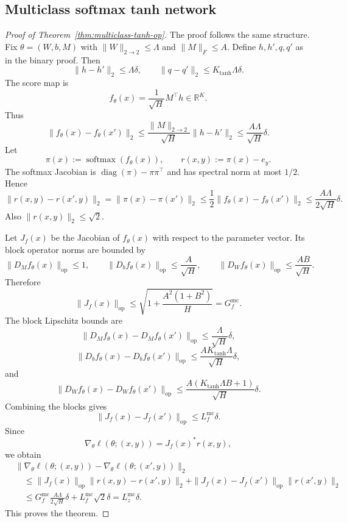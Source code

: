 \documentclass[conference,compsoc]{IEEEtran}
\DeclareMathOperator{\softmax}{softmax}
\DeclareMathOperator{\diag}{diag}
\newcommand{\R}{\mathbb{R}}
\begin{document}
\subsection{Multiclass softmax tanh network}

\begin{proof}[Proof of Theorem~\ref{thm:multiclass-tanh-op}]
The proof follows the same structure. Fix $\theta=(W,b,M)$ with $\|W\|_{2\to2}\le\Lambda$ and $\|M\|_F\le A$. Define $h,h',q,q'$ as in the binary proof. Then
\[
\|h-h'\|_2\le\Lambda\delta,
\qquad
\|q-q'\|_2\le K_{\tanh}\Lambda\delta.
\]
The score map is
\[
f_\theta(x)=\frac1{\sqrt H}M^\top h\in\R^K.
\]
Thus
\[
\|f_\theta(x)-f_\theta(x')\|_2
\le\frac{\|M\|_{2\to2}}{\sqrt H}\|h-h'\|_2
\le\frac{A\Lambda}{\sqrt H}\delta.
\]
Let
\[
\pi(x):=\softmax(f_\theta(x)),
\qquad
r(x,y):=\pi(x)-e_y.
\]
The softmax Jacobian is $\diag(\pi)-\pi\pi^\top$ and has spectral norm at most $1/2$. Hence
\[
\|r(x,y)-r(x',y)\|_2
=\|\pi(x)-\pi(x')\|_2
\le\frac12\|f_\theta(x)-f_\theta(x')\|_2
\le\frac{A\Lambda}{2\sqrt H}\delta.
\]
Also $\|r(x,y)\|_2\le\sqrt2$.

Let $J_f(x)$ be the Jacobian of $f_\theta(x)$ with respect to the parameter vector. Its block operator norms are bounded by
\[
\|D_M f_\theta(x)\|_{\mathrm{op}}\le1,
\qquad
\|D_b f_\theta(x)\|_{\mathrm{op}}\le\frac{A}{\sqrt H},
\qquad
\|D_W f_\theta(x)\|_{\mathrm{op}}\le\frac{AB}{\sqrt H}.
\]
Therefore
\[
\|J_f(x)\|_{\mathrm{op}}
\le
\sqrt{1+\frac{A^2(1+B^2)}{H}}
=G_f^{\mathrm{mc}}.
\]
The block Lipschitz bounds are
\[
\|D_M f_\theta(x)-D_M f_\theta(x')\|_{\mathrm{op}}
\le\frac{\Lambda}{\sqrt H}\delta,
\]
\[
\|D_b f_\theta(x)-D_b f_\theta(x')\|_{\mathrm{op}}
\le\frac{AK_{\tanh}\Lambda}{\sqrt H}\delta,
\]
and
\[
\|D_W f_\theta(x)-D_W f_\theta(x')\|_{\mathrm{op}}
\le\frac{A(K_{\tanh}\Lambda B+1)}{\sqrt H}\delta.
\]
Combining the blocks gives
\[
\|J_f(x)-J_f(x')\|_{\mathrm{op}}\le L_f^{\mathrm{mc}}\delta.
\]
Since
\[
\nabla_\theta\ell(\theta;(x,y))=J_f(x)^*r(x,y),
\]
we obtain
\[
\begin{aligned}
&\|\nabla_\theta\ell(\theta;(x,y))-\nabla_\theta\ell(\theta;(x',y))\|_2\\
&\quad\le
\|J_f(x)\|_{\mathrm{op}}\|r(x,y)-r(x',y)\|_2
+\|J_f(x)-J_f(x')\|_{\mathrm{op}}\|r(x',y)\|_2\\
&\quad\le
G_f^{\mathrm{mc}}\frac{A\Lambda}{2\sqrt H}\delta+
L_f^{\mathrm{mc}}\sqrt2\delta
=L_z^{\mathrm{mc}}\delta.
\end{aligned}
\]
This proves the theorem.
\end{proof}
\end{document}

